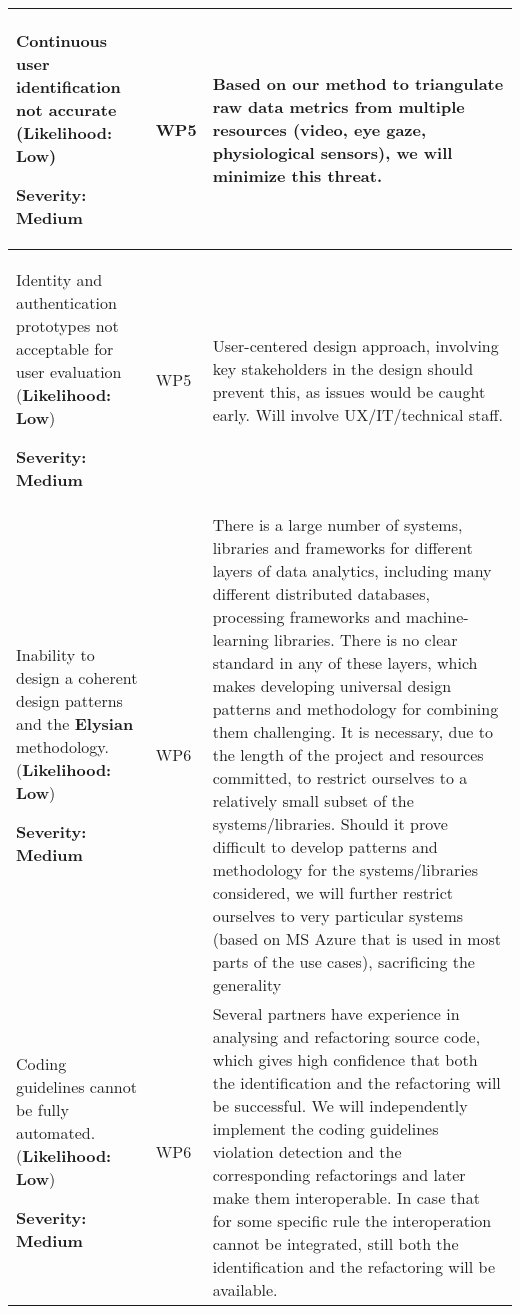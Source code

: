 \documentclass[a4paper,11pt]{article}
\newcommand{\project}[1]{\textbf{#1}\xspace}
\newcommand{\SECURITY}{\project{Elysian}}
\newcommand{\TheProject}{\SECURITY}
\begin{document}
\begin{longtable}{| p{3.5cm} | p{1.5cm} | p{11.8cm}  |}

\\\hline
Continuous user identification not accurate 
(\textbf{Likelihood: Low})
\par
{\textbf{Severity: Medium}}
& WP5 &
Based on our method to triangulate raw data metrics from multiple resources (video, eye gaze, physiological sensors), we will minimize this threat.

\\\hline
Identity and authentication prototypes not acceptable for user evaluation 
(\textbf{Likelihood: Low})
\par
{\textbf{Severity: Medium}}
& WP5 &
User-centered design approach, involving key stakeholders in the design should prevent this, as issues would be caught early. Will involve UX/IT/technical staff.


\\\hline
Inability to design a coherent design patterns and the \TheProject{} methodology.%
(\textbf{Likelihood: Low})
\par
{\textbf{Severity: Medium}}
& WP6 &
There is a large number of systems, libraries and frameworks for different layers of data analytics, including many different distributed databases, processing frameworks and machine-learning libraries. There is no clear standard in any of these layers, which makes developing universal design patterns and methodology for combining them challenging. It is necessary, due to the length of the project and resources committed, to restrict ourselves to a relatively small subset of the systems/libraries. Should it prove difficult to develop patterns and methodology for the systems/libraries considered, we will further restrict ourselves to very particular systems (based on MS Azure that is used in most parts of the use cases), sacrificing the generality 

\\\hline
Coding guidelines cannot be
fully automated.
(\textbf{Likelihood: Low})
\par
{\textbf{Severity: Medium}}
& WP6 &
Several partners have experience in analysing and
refactoring source code, which gives high confidence that both the
identification and the refactoring will be successful.
We will independently implement the coding guidelines violation detection
and the corresponding refactorings and later make them interoperable.
In case that for some specific rule the  interoperation cannot be integrated, still both the identification
and the refactoring will be available.


\end{longtable}
\end{document}
